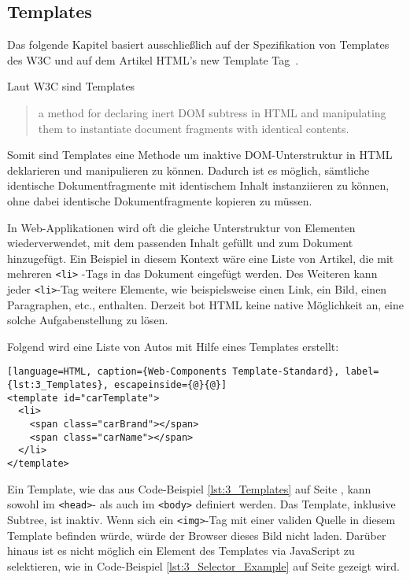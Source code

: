 \subsection{Templates}
\label{sec:3_WC_Templates}

Das folgende Kapitel basiert ausschließlich auf der Spezifikation von Templates des W3C \citereset \autocite[siehe][]{Weinstein.2013} und auf dem Artikel \glqq HTML's new Template Tag\grqq\ \citereset \autocite[siehe][]{BidelmanTemplate.2013}.

Laut W3C sind Templates
\begin{quote}
\glqq
  a method for declaring inert DOM subtress in HTML and manipulating them to instantiate document fragments with identical contents.
\grqq
\end{quote}
Somit sind Templates eine Methode um inaktive DOM-Unterstruktur in HTML deklarieren und manipulieren zu können. Dadurch ist es möglich, sämtliche identische Dokumentfragmente mit identischem Inhalt instanziieren zu können, ohne dabei identische Dokumentfragmente kopieren zu müssen.

In Web-Applikationen wird oft die gleiche Unterstruktur von Elementen wiederverwendet, mit dem passenden Inhalt gefüllt und zum Dokument hinzugefügt. Ein Beispiel in diesem Kontext wäre eine Liste von Artikel, die mit mehreren \lstinline|<li>| -Tags in das Dokument eingefügt werden. Des Weiteren kann jeder \lstinline|<li>|-Tag weitere Elemente, wie beispielsweise einen Link, ein Bild, einen Paragraphen, etc., enthalten. Derzeit bot HTML keine native Möglichkeit an, eine solche Aufgabenstellung zu lösen.

Folgend wird eine Liste von Autos mit Hilfe eines Templates erstellt:
\begin{lstlisting}[language=HTML, caption={Web-Components Template-Standard}, label={lst:3_Templates}, escapeinside={@}{@}]
<template id="carTemplate">
  <li>
    <span class="carBrand"></span>
    <span class="carName"></span>
  </li>
</template>
\end{lstlisting}

Ein Template, wie das aus Code-Beispiel \ref{lst:3_Templates} auf Seite \pageref{lst:3_Templates}, kann sowohl im \lstinline|<head>|- als auch im \lstinline|<body>| definiert werden. Das Template, inklusive Subtree, ist inaktiv. Wenn sich ein \lstinline|<img>|-Tag mit einer validen Quelle in diesem Template befinden würde, würde der Browser dieses Bild nicht laden. Darüber hinaus ist es nicht möglich ein Element des Templates via JavaScript zu selektieren, wie in Code-Beispiel \ref{lst:3_Selector_Example} auf Seite \pageref{lst:3_Selector_Example} gezeigt wird.

